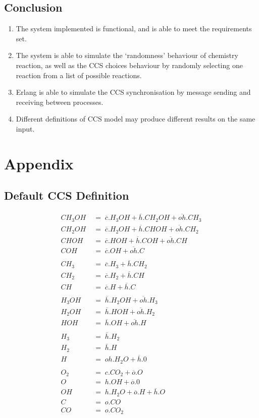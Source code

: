 \documentclass[12pt, a4paper]{article}
\begin{document}
\subsection{Conclusion}
\begin{enumerate}
  \item The system implemented is functional, and is able to meet the requirements set.
  \item The system is able to simulate the `randomness' behaviour of chemistry reaction, as well as
  the CCS choices behaviour by randomly selecting one reaction from a list of possible reactions.
  \item Erlang is able to simulate the CCS synchronisation by message sending and receiving between
  processes.
  \item Different definitions of CCS model may produce different results on the same input.
\end{enumerate}

\printbibliography

\appendix
\section*{Appendix}
\subsection*{Default CCS Definition}
\begin{align*}
  CH_3OH \; &= \; \overline{c}.H_3OH + \overline{h}.CH_2OH + \overline{oh}.CH_3 \\
  CH_2OH \; &= \; \overline{c}.H_2OH + \overline{h}.CHOH + \overline{oh}.CH_2 \\
  CHOH \; &= \; \overline{c}.HOH + \overline{h}.COH + \overline{oh}.CH \\
  COH \; &= \; \overline{c}.OH + \overline{oh}.C \\
  \\
  CH_3 \; &= \; \overline{c}.H_3 + \overline{h}.CH_2 \\
  CH_2 \; &= \; \overline{c}.H_2 + \overline{h}.CH \\
  CH \; &= \; \overline{c}.H + \overline{h}.C \\
  \\
  H_3OH \; &= \; \overline{h}.H_2OH + \overline{oh}.H_3 \\
  H_2OH \; &= \; \overline{h}.HOH + \overline{oh}.H_2 \\
  HOH \; &= \; \overline{h}.OH + \overline{oh}.H \\
  \\
  H_3 \; &= \; \overline{h}.H_2 \\
  H_2 \; &= \; \overline{h}.H \\
  H \; &= \; oh.H_2O + \overline{h}.0\\
  \\
  O_2 \; &= \; c.CO_2 + \overline{o}.O \\
  O \; &= \; h.OH + \overline{o}.0 \\
  OH \; &= \; h.H_2O + \overline{o}.H + \overline{h}.O \\
  C \; &= \; o.CO \\
  CO \; &= \; o.CO_2
\end{align*}
\end{document}

